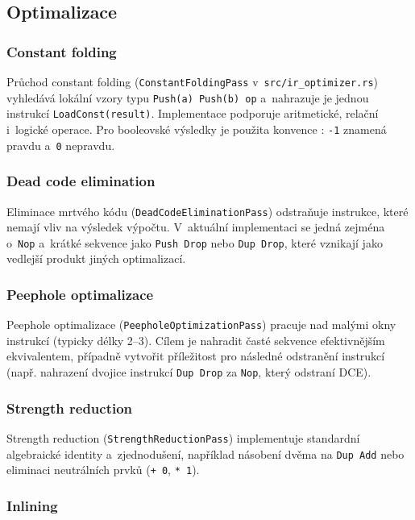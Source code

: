 \subsection{Optimalizace}
\label{sec:optimalizace}

\subsubsection{Constant folding}

Průchod constant folding (\texttt{ConstantFoldingPass} v~\texttt{src/ir\_optimizer.rs})
vyhledává lokální vzory typu \texttt{Push(a) Push(b) op} a~nahrazuje je jednou
instrukcí \texttt{LoadConst(result)}. Implementace podporuje aritmetické,
relační i~logické operace. Pro booleovské výsledky je použita konvence \Forth{}:
\texttt{-1} znamená pravdu a~\texttt{0} nepravdu.

\subsubsection{Dead code elimination}

Eliminace mrtvého kódu (\texttt{DeadCodeEliminationPass}) odstraňuje instrukce,
které nemají vliv na výsledek výpočtu. V~aktuální implementaci se jedná zejména
o~\texttt{Nop} a~krátké sekvence jako \texttt{Push \; Drop} nebo \texttt{Dup \; Drop},
které vznikají jako vedlejší produkt jiných optimalizací.

\subsubsection{Peephole optimalizace}

Peephole optimalizace (\texttt{PeepholeOptimizationPass}) pracuje nad
malými okny instrukcí (typicky délky 2--3). Cílem je nahradit časté
sekvence efektivnějším ekvivalentem, případně vytvořit příležitost
pro následné odstranění instrukcí (např. nahrazení dvojice instrukcí
\texttt{Dup Drop} za \texttt{Nop}, který odstraní DCE).

\subsubsection{Strength reduction}

Strength reduction (\texttt{StrengthReductionPass}) implementuje standardní
algebraické identity a~zjednodušení, například násobení dvěma na \texttt{Dup Add}
nebo eliminaci neutrálních prvků (\texttt{+ 0}, \texttt{* 1}).

\subsubsection{Inlining}

